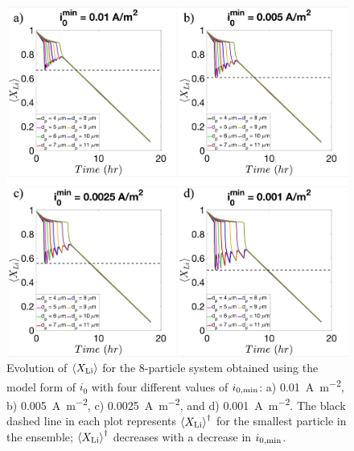 \documentclass{article}
\begin{document}
\begin{figure}
  \includegraphics{figures/i0_models.png}
  \caption{Evolution of $\left<X_{\rm{Li}}\right>$ for the 8-particle
    system obtained using the model form of $i_0$ with four different
    values of $i_{0,\rm{min}}$: a)
    \SI{0.01}{\ampere\per\meter\squared}, b)
    \SI{0.005}{\ampere\per\meter\squared}, c)
    \SI{0.0025}{\ampere\per\meter\squared}, and d)
    \SI{0.001}{\ampere\per\meter\squared}. The black dashed line in
    each plot represents $\left<X_{\rm{Li}}\right>^\dagger$ for the
    smallest particle in the ensemble;
    $\left<X_{\rm{Li}}\right>^\dagger$ decreases with a decrease in
    $i_{0,\rm{min}}$.}
  \label{fig:i0_models}
\end{figure}
\end{document}
